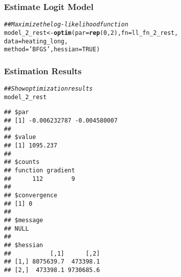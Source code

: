 \documentclass{beamer}\usepackage[]{graphicx}\usepackage[]{xcolor}
\makeatletter
\newcommand{\hlnum}[1]{\textcolor[rgb]{0.686,0.059,0.569}{#1}}%
\newcommand{\hlstr}[1]{\textcolor[rgb]{0.192,0.494,0.8}{#1}}%
\newcommand{\hlcom}[1]{\textcolor[rgb]{0.678,0.584,0.686}{\textit{#1}}}%
\newcommand{\hlstd}[1]{\textcolor[rgb]{0.345,0.345,0.345}{#1}}%
\newcommand{\hlkwb}[1]{\textcolor[rgb]{0.69,0.353,0.396}{#1}}%
\newcommand{\hlkwc}[1]{\textcolor[rgb]{0.333,0.667,0.333}{#1}}%
\newcommand{\hlkwd}[1]{\textcolor[rgb]{0.737,0.353,0.396}{\textbf{#1}}}%
\newenvironment{kframe}{%
 \def\at@end@of@kframe{}%
 \ifinner\ifhmode%
  \def\at@end@of@kframe{\end{minipage}}%
  \begin{minipage}{\columnwidth}%
 \fi\fi%
 \def\FrameCommand##1{\hskip\@totalleftmargin \hskip-\fboxsep
 \colorbox{shadecolor}{##1}\hskip-\fboxsep
     \hskip-\linewidth \hskip-\@totalleftmargin \hskip\columnwidth}%
 \MakeFramed {\advance\hsize-\width
   \@totalleftmargin\z@ \linewidth\hsize
   \@setminipage}}%
 {\par\unskip\endMakeFramed%
 \at@end@of@kframe}
\newenvironment{knitrout}{}{} %
\makeatother
\begin{document}
\begin{frame}[fragile]\frametitle{Estimate Logit Model}
\begin{knitrout}\footnotesize
{}\color{fgcolor}\begin{kframe}
\begin{alltt}
\hlcom{## Maximize the log-likelihood function}
\hlstd{model_2_rest} \hlkwb{<-} \hlkwd{optim}\hlstd{(}\hlkwc{par} \hlstd{=} \hlkwd{rep}\hlstd{(}\hlnum{0}\hlstd{,} \hlnum{2}\hlstd{),} \hlkwc{fn} \hlstd{= ll_fn_2_rest,}
                      \hlkwc{data} \hlstd{= heating_long,}
                      \hlkwc{method} \hlstd{=} \hlstr{'BFGS'}\hlstd{,} \hlkwc{hessian} \hlstd{=} \hlnum{TRUE}\hlstd{)}
\end{alltt}
\end{kframe}
\end{knitrout}
\end{frame}

\begin{frame}[fragile]\frametitle{Estimation Results}
    \vspace{1ex}
\begin{knitrout}\scriptsize
{}\color{fgcolor}\begin{kframe}
\begin{alltt}
\hlcom{## Show optimization results}
\hlstd{model_2_rest}
\end{alltt}
\begin{verbatim}
## $par
## [1] -0.006232787 -0.004580007
## 
## $value
## [1] 1095.237
## 
## $counts
## function gradient 
##      112        9 
## 
## $convergence
## [1] 0
## 
## $message
## NULL
## 
## $hessian
##           [,1]      [,2]
## [1,] 8075639.7  473398.1
## [2,]  473398.1 9730685.6
\end{verbatim}
\end{kframe}
\end{knitrout}
\end{frame}
\end{document}

